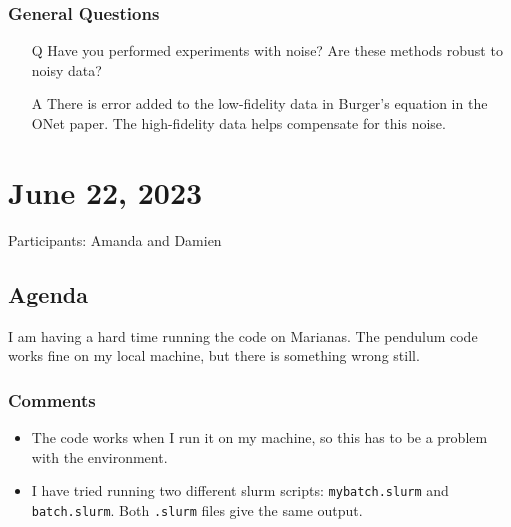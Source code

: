 \documentclass{article}
\begin{document}
\subsubsection*{General Questions}
\begin{itemize}
	\item[Q] Have you performed experiments with noise? Are these methods robust to noisy data?
	\item[A] There is error added to the low-fidelity data in Burger's equation in the ONet paper. The high-fidelity data helps compensate for this noise.
\end{itemize}
\newpage
\section*{June 22, 2023}
Participants: Amanda and Damien
\subsection*{Agenda}
I am having a hard time running the code on Marianas. The pendulum code works fine on my local machine, but there is something wrong still.
\subsubsection*{Comments}
\begin{itemize}
\item The code works when I run it on my machine, so this has to be a problem with the environment.
\item I have tried running two different slurm scripts: \verb|mybatch.slurm| and \verb|batch.slurm|. Both \verb|.slurm| files give the same output.
\end{itemize}
\end{document}
